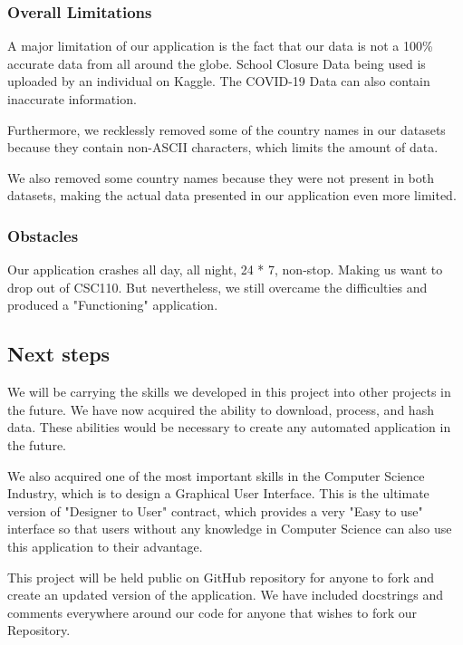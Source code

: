 \documentclass[fontsize=11pt]{article}
\begin{document}
    \subsubsection{Overall Limitations}

    A major limitation of our application is the fact that our data is not a 100\% accurate data from all around the globe. School Closure Data being used is uploaded by an individual on Kaggle. The COVID-19 Data can also contain inaccurate information.

    Furthermore, we recklessly removed some of the country names in our datasets because they contain non-ASCII characters, which limits the amount of data.

    We also removed some country names because they were not present in both datasets, making the actual data presented in our application even more limited.

    \subsubsection{Obstacles}

    Our application crashes all day, all night, 24 * 7, non-stop. Making us want to drop out of CSC110. But nevertheless, we still overcame the difficulties and produced a "Functioning" application.

    \subsection{Next steps}

    We will be carrying the skills we developed in this project into other projects in the future. We have now acquired the ability to download, process, and hash data. These abilities would be necessary to create any automated application in the future.

    We also acquired one of the most important skills in the Computer Science Industry, which is to design a Graphical User Interface. This is the ultimate version of "Designer to User" contract, which provides a very "Easy to use" interface so that users without any knowledge in Computer Science can also use this application to their advantage.

    This project will be held public on GitHub repository for anyone to fork and create an updated version of the application. We have included docstrings and comments everywhere around our code for anyone that wishes to fork our Repository.
\end{document}
